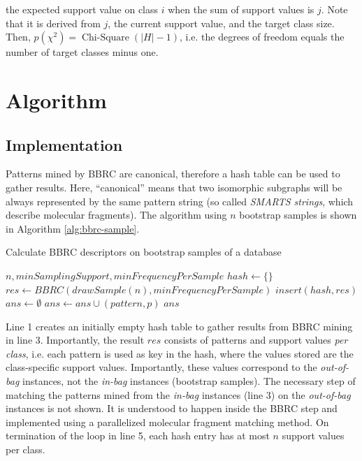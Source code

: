 \documentclass{article}
\begin{document}
the expected support value on class $i$ when the sum of support values is $j$. Note that it is derived from $j$, the current support value, and the target class size. Then, $p(\chi^2)=\operatorname{Chi-Square}\left(\vert H\vert-1\right)$, i.e. the degrees of freedom equals the number of target classes minus one.

\section{Algorithm}

\subsection{Implementation}
Patterns mined by BBRC are canonical, therefore a hash table can be used to gather results. Here, ``canonical'' means that two isomorphic subgraphs will be always represented by the same pattern string (so called \emph{SMARTS strings}, which describe molecular fragments). The algorithm using $n$ bootstrap samples is shown in Algorithm \ref{alg:bbrc-sample}.
\renewcommand{\algorithmicrequire}{\textbf{Input:}}
\renewcommand{\algorithmicensure}{\textbf{Output:}}
\begin{algorithm}
  \caption{Calculate BBRC descriptors on bootstrap samples of a database}
  \label{alg:bbrc-sample}
\begin{algorithmic}[1]
  \Require $n, minSamplingSupport, minFrequencyPerSample$
  \State $hash \gets \{\}$
   
    \State $res \gets BBRC(drawSample(n), minFrequencyPerSample)$
    \State $insert(hash,res)$
  \EndFor
  \State $ans \gets \emptyset$
        \State $ans\gets ans \cup (pattern,p)$
      \EndIf
    \EndIf
  \EndFor
  \Ensure $ans$
\end{algorithmic}
\end{algorithm}

Line 1 creates an initially empty hash table to gather results from BBRC mining in line 3. Importantly, the result $res$ consists of patterns and support values \emph{per class}, i.e. each pattern is used as key in the hash, where the values stored are the class-specific support values. Importantly, these values correspond to the \emph{out-of-bag} instances, not the \emph{in-bag} instances (bootstrap samples). The necessary step of matching the patterns mined from the \emph{in-bag} instances (line 3) on the \emph{out-of-bag} instances is not shown. It is understood to happen inside the BBRC step and implemented using a parallelized molecular fragment matching method. On termination of the loop in line 5, each hash entry has at most $n$ support values per class.
\end{document}
